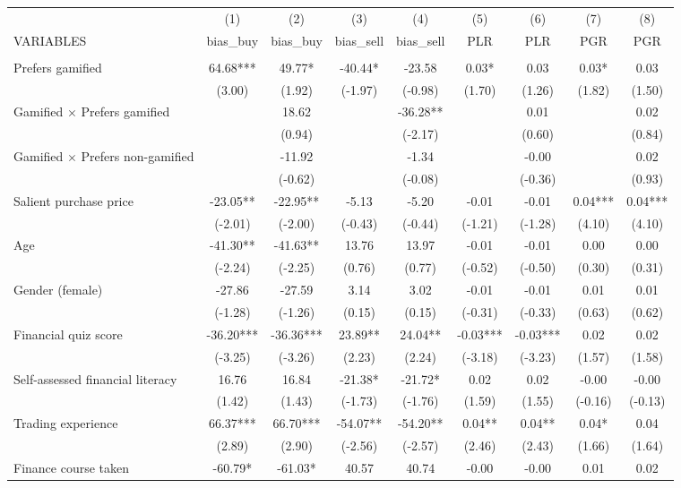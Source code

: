 \documentclass[]{article}
\begin{document}
\begin{tabular}{lcccccccc} \hline
 & (1) & (2) & (3) & (4) & (5) & (6) & (7) & (8) \\
VARIABLES & bias\_buy & bias\_buy & bias\_sell & bias\_sell & PLR & PLR & PGR & PGR \\ \hline
 &  &  &  &  &  &  &  &  \\
Prefers gamified & 64.68*** & 49.77* & -40.44* & -23.58 & 0.03* & 0.03 & 0.03* & 0.03 \\
 & (3.00) & (1.92) & (-1.97) & (-0.98) & (1.70) & (1.26) & (1.82) & (1.50) \\
Gamified $\times$ Prefers gamified &  & 18.62 &  & -36.28** &  & 0.01 &  & 0.02 \\
 &  & (0.94) &  & (-2.17) &  & (0.60) &  & (0.84) \\
Gamified $\times$ Prefers non-gamified &  & -11.92 &  & -1.34 &  & -0.00 &  & 0.02 \\
 &  & (-0.62) &  & (-0.08) &  & (-0.36) &  & (0.93) \\
Salient purchase price & -23.05** & -22.95** & -5.13 & -5.20 & -0.01 & -0.01 & 0.04*** & 0.04*** \\
 & (-2.01) & (-2.00) & (-0.43) & (-0.44) & (-1.21) & (-1.28) & (4.10) & (4.10) \\
Age & -41.30** & -41.63** & 13.76 & 13.97 & -0.01 & -0.01 & 0.00 & 0.00 \\
 & (-2.24) & (-2.25) & (0.76) & (0.77) & (-0.52) & (-0.50) & (0.30) & (0.31) \\
Gender (female) & -27.86 & -27.59 & 3.14 & 3.02 & -0.01 & -0.01 & 0.01 & 0.01 \\
 & (-1.28) & (-1.26) & (0.15) & (0.15) & (-0.31) & (-0.33) & (0.63) & (0.62) \\
Financial quiz score & -36.20*** & -36.36*** & 23.89** & 24.04** & -0.03*** & -0.03*** & 0.02 & 0.02 \\
 & (-3.25) & (-3.26) & (2.23) & (2.24) & (-3.18) & (-3.23) & (1.57) & (1.58) \\
Self-assessed financial literacy & 16.76 & 16.84 & -21.38* & -21.72* & 0.02 & 0.02 & -0.00 & -0.00 \\
 & (1.42) & (1.43) & (-1.73) & (-1.76) & (1.59) & (1.55) & (-0.16) & (-0.13) \\
Trading experience & 66.37*** & 66.70*** & -54.07** & -54.20** & 0.04** & 0.04** & 0.04* & 0.04 \\
 & (2.89) & (2.90) & (-2.56) & (-2.57) & (2.46) & (2.43) & (1.66) & (1.64) \\
Finance course taken & -60.79* & -61.03* & 40.57 & 40.74 & -0.00 & -0.00 & 0.01 & 0.02 \\

\end{tabular}
\end{document}

